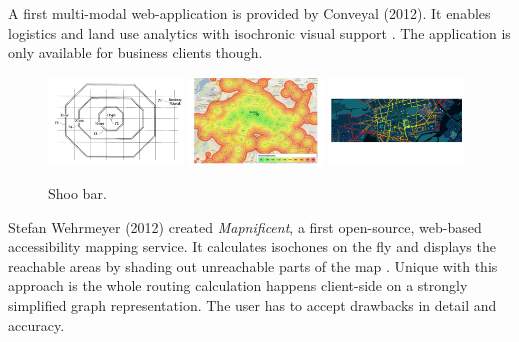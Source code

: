     A first multi-modal web-application is provided by Conveyal (2012). It
    enables logistics and land use analytics with isochronic visual
    support \cite{Conveyal}. The application is only available for business
    clients though.\par

    \begin{figure}[t]
      {\includegraphics[width=0.32\textwidth]{./img/overv-patnt.png}}
      \hfill
      {\includegraphics[width=0.32\textwidth]{./img/overv-berln.png}}
      \hfill
      {\includegraphics[width=0.32\textwidth]{./img/overv-potsd.png}}
      \caption{Shoo bar.}
      \label{fig:overv:4}
    \end{figure}

    Stefan Wehrmeyer (2012) created \textit{Mapnificent}, a first open-source,
    web-based accessibility mapping service. It calculates isochones on the fly
    and displays the reachable areas by shading out unreachable parts of the
    map \cite{Mapnificent}. Unique with this approach is the whole routing
    calculation happens client-side on a strongly simplified graph
    representation. The user has to accept drawbacks in detail and accuracy.\par

